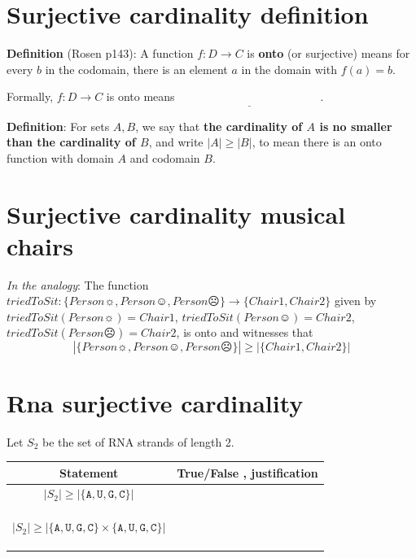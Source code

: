 \documentclass[12pt, oneside]{article}
\newcommand{\A}[0]{\texttt{A}}
\newcommand{\C}[0]{\texttt{C}}
\newcommand{\G}[0]{\texttt{G}}
\newcommand{\U}[0]{\texttt{U}}
\begin{document}
\section*{Surjective cardinality definition}


{\bf Definition}  (Rosen p143): A function $f: D  \to C$ is {\bf onto} (or  surjective) means for every $b$ in the codomain, 
there  is an element $a$ in the domain with  $f(a) = b$.


Formally, $f: D  \to  C$ is  onto  means $\underline{\phantom{\forall b \in C  \exists a \in D ( f(a) = b)}}$.


{\bf Definition}:  For sets $A, B$, we say that  {\bf the  cardinality of $A$ is  no  smaller than the cardinality of  $B$}, and 
write $|A| \geq |B|$, to mean there is an onto function  with domain $A$  and codomain $B$.
 \vfill
\section*{Surjective cardinality musical chairs}


{\it In the analogy}: The function $triedToSit: \{ Person\sun, Person\smiley, Person\frownie \} \to  \{ Chair1, Chair2\} $ given
by $triedToSit(Person\sun) = Chair1$,  $triedToSit(Person\smiley) = Chair2$, 
$triedToSit(Person\frownie) = Chair2$, is onto and witnesses that 
\[
 |\{ Person\sun, Person\smiley, Person\frownie \}| \geq | \{ Chair1, Chair2\} |
\] \vfill
\section*{Rna surjective cardinality}


Let $S_2$ be the set of RNA strands of length 2.

\vspace{-20pt}

\begin{center}
\begin{tabular}{|c|p{5in}|}
\hline
Statement  &  True/False , justification \\
\hline
$ |S_2 | \geq | \{\A,\U,\G,\C\} |$ &  \\
&\\&\\&\\
\hline
$ |S_2 | \geq | \{\A,\U,\G,\C\} \times \{\A, \U, \G,\C\} |$ &  \\
&\\&\\&\\
\hline
\end{tabular}
\end{center} \vfill
\end{document}
